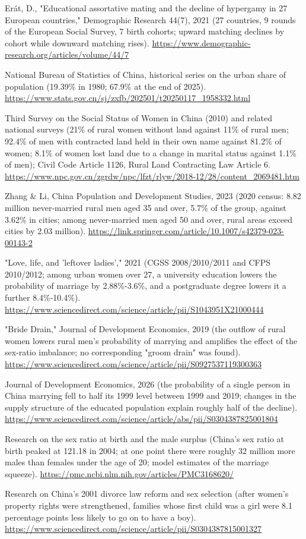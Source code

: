 \documentclass[11pt,a4paper]{article}
\begin{document}
\noindent [144] Erát, D., "Educational assortative mating and the decline of hypergamy in 27 European countries," Demographic Research 44(7), 2021 (27 countries, 9 rounds of the European Social Survey, 7 birth cohorts; upward matching declines by cohort while downward matching rises). \url{https://www.demographic-research.org/articles/volume/44/7}

\noindent [145] National Bureau of Statistics of China, historical series on the urban share of population (19.39\% in 1980; 67.9\% at the end of 2025). \url{https://www.stats.gov.cn/sj/zxfb/202501/t20250117\_1958332.html}

\noindent [146] Third Survey on the Social Status of Women in China (2010) and related national surveys (21\% of rural women without land against 11\% of rural men; 92.4\% of men with contracted land held in their own name against 81.2\% of women; 8.1\% of women lost land due to a change in marital status against 1.1\% of men); Civil Code Article 1126, Rural Land Contracting Law Article 6. \url{https://www.npc.gov.cn/zgrdw/npc/lfzt/rlyw/2018-12/28/content\_2069481.htm}

\noindent [147] Zhang \& Li, China Population and Development Studies, 2023 (2020 census: 8.82 million never-married rural men aged 35 and over, 5.7\% of the group, against 3.62\% in cities; among never-married men aged 50 and over, rural areas exceed cities by 2.03 million). \url{https://link.springer.com/article/10.1007/s42379-023-00143-2}

\noindent [148] "Love, life, and 'leftover ladies'," 2021 (CGSS 2008/2010/2011 and CFPS 2010/2012; among urban women over 27, a university education lowers the probability of marriage by 2.88\%-3.6\%, and a postgraduate degree lowers it a further 8.4\%-10.4\%). \url{https://www.sciencedirect.com/science/article/pii/S1043951X21000444}

\noindent [149] "Bride Drain," Journal of Development Economics, 2019 (the outflow of rural women lowers rural men's probability of marrying and amplifies the effect of the sex-ratio imbalance; no corresponding "groom drain" was found). \url{https://www.sciencedirect.com/science/article/pii/S0927537119300363}

\noindent [150] Journal of Development Economics, 2026 (the probability of a single person in China marrying fell to half its 1999 level between 1999 and 2019; changes in the supply structure of the educated population explain roughly half of the decline). \url{https://www.sciencedirect.com/science/article/abs/pii/S0304387825001804}

\noindent [151] Research on the sex ratio at birth and the male surplus (China's sex ratio at birth peaked at 121.18 in 2004; at one point there were roughly 32 million more males than females under the age of 20; model estimates of the marriage squeeze). \url{https://pmc.ncbi.nlm.nih.gov/articles/PMC3168620/}

\noindent [152] Research on China's 2001 divorce law reform and sex selection (after women's property rights were strengthened, families whose first child was a girl were 8.1 percentage points less likely to go on to have a boy). \url{https://www.sciencedirect.com/science/article/pii/S0304387815001327}
\end{document}
